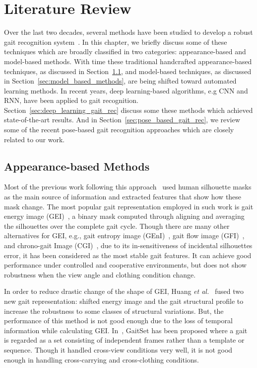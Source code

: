 \chapter{Literature Review} \label{ch:literature_review}
Over the last two decades, several methods have been studied to develop a robust gait recognition system~\cite{Rida_19}. In this chapter, we briefly discuss some of these techniques which are broadly classified in two categories: appearance-based and model-based methods. With time these traditional handcrafted appearance-based techniques, as discussed in Section~\ref{sec:appearance_based_methods}, and model-based techniques, as discussed in Section~\ref{sec:model_based_methods}, are being shifted toward automated learning methods. In recent years, deep learning-based algorithms, e.g CNN and RNN, have been applied to gait recognition.  Section~\ref{sec:deep_learning_gait_rec} discuss some these methods which achieved state-of-the-art results. And in Section~\ref{sec:pose_based_gait_rec}, we review some of the recent pose-based gait recognition approaches which are closely related to our work. 


\section{Appearance-based Methods} \label{sec:appearance_based_methods}
Most of the previous work following this approach~\cite{Han_06, Bashir_09, Lam_11} used human silhouette masks as the main source of information and extracted features that show how these mask change. The most popular gait representation employed in such work is gait energy image (GEI)~\cite{Han_06}, a binary mask computed through aligning and averaging the silhouettes over the complete gait cycle. Though there are many other alternatives for GEI, e.g., gait entropy image (GEnI)~\cite{Bashir_09}, gait flow image (GFI)~\cite{Lam_11}, and chrono-gait Image (CGI)~\cite{Wang_12}, due to its in-sensitiveness of incidental silhouettes error, it has been considered as the most stable gait features.  It can achieve good performance under controlled and cooperative environments, but does not show robustness when the view angle and clothing condition change. 

In order to reduce drastic change of the shape of GEI, Huang \textit{et al.}~\cite{Huang_12} fused two new gait representation: shifted energy image and the gait structural profile to increase the robustness to some classes of structural variations. But, the performance of this method is not good enough due to the loss of temporal information while calculating GEI. In~\cite{Chao_19}, GaitSet has been proposed where a gait is regarded as a set consisting of independent frames rather than a template or sequence. Though it handled cross-view conditions very well, it is not good enough in handling cross-carrying and cross-clothing conditions. 

